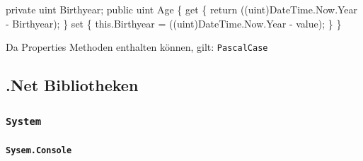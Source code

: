 \documentclass[
  9pt,
  a4paperpaper,
  DIV=11]{scrartcl}
\let\oldparagraph\paragraph
\renewcommand{\paragraph}[1]{\oldparagraph{#1}\mbox{}}
\newenvironment{Shaded}{}{}
\newcommand{\DataTypeTok}[1]{\textcolor[rgb]{0.84,0.23,0.29}{#1}}
\newcommand{\FunctionTok}[1]{\textcolor[rgb]{0.44,0.26,0.76}{#1}}
\newcommand{\KeywordTok}[1]{\textcolor[rgb]{0.84,0.23,0.29}{#1}}
\newcommand{\NormalTok}[1]{\textcolor[rgb]{0.14,0.16,0.18}{#1}}
\newcommand{\OperatorTok}[1]{\textcolor[rgb]{0.14,0.16,0.18}{#1}}
\numberwithin{equation}{section}
\begin{document}
\begin{multicols}{2}
\begin{Shaded}
\begin{Highlighting}[]
\KeywordTok{private} \DataTypeTok{uint}\NormalTok{ Birthyear}\OperatorTok{;}
\KeywordTok{public} \DataTypeTok{uint}\NormalTok{ Age }\OperatorTok{\{}
  \KeywordTok{get} \OperatorTok{\{} 
    \KeywordTok{return} \OperatorTok{((}\DataTypeTok{uint}\OperatorTok{)}\NormalTok{DateTime}\OperatorTok{.}\FunctionTok{Now}\OperatorTok{.}\FunctionTok{Year} \OperatorTok{{-}}\NormalTok{ Birthyear}\OperatorTok{);} 
    \OperatorTok{\}}
  \KeywordTok{set} \OperatorTok{\{} 
    \KeywordTok{this}\OperatorTok{.}\FunctionTok{Birthyear} \OperatorTok{=} \OperatorTok{((}\DataTypeTok{uint}\OperatorTok{)}\NormalTok{DateTime}\OperatorTok{.}\FunctionTok{Now}\OperatorTok{.}\FunctionTok{Year} \OperatorTok{{-}}\NormalTok{ value}\OperatorTok{);} 
    \OperatorTok{\}}
\OperatorTok{\}}
\end{Highlighting}
\end{Shaded}

\begin{tcolorbox}[enhanced jigsaw, colbacktitle=quarto-callout-important-color!10!white, colback=white, rightrule=.15mm, title=\textcolor{quarto-callout-important-color}{\faExclamation}\hspace{0.5em}{Namensgebung}, opacityback=0, arc=.35mm, coltitle=black, opacitybacktitle=0.6, breakable, bottomtitle=1mm, toptitle=1mm, colframe=quarto-callout-important-color-frame, bottomrule=.15mm, titlerule=0mm, left=2mm, leftrule=.75mm, toprule=.15mm]

Da Properties Methoden enthalten können, gilt: \texttt{PascalCase}

\end{tcolorbox}

\hypertarget{net-bibliotheken}{%
\subsection{.Net Bibliotheken}\label{net-bibliotheken}}

\hypertarget{system}{%
\subsubsection{\texorpdfstring{\texttt{System}}{System}}\label{system}}

\hypertarget{sysem.console}{%
\paragraph{\texorpdfstring{\texttt{Sysem.Console}}{Sysem.Console}}\label{sysem.console}}


\end{multicols}
\end{document}
